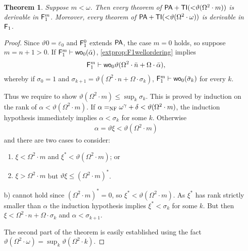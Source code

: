 \documentclass[UKenglish,cleveref,DIV=12]{scrartcl}
\newtheorem{theorem}{Theorem}
\newtheorem{corollary}[lemma]{Corollary}
\theoremstyle{definition}
\theoremstyle{definition}
\begin{document}
\begin{theorem}\label{extcor:F1lowerbound}\label{extthm:F1lowerbound}
Suppose $m<\omega$. Then every theorem of
$\mathsf{PA}+\mathsf{TI}(\mathord<\vartheta(\Omega^2\cdot m))$  is derivable in
$\mathsf{F}_1^{m}$. Moreover, every theorem of
$\mathsf{PA}+\mathsf{TI}(\mathord<\vartheta(\Omega^2\cdot \omega))$ is derivable in
$\mathsf{F}_1$.
\end{theorem}
\begin{proof}
Since $\vartheta0=\varepsilon_0$ and $\mathsf{F}_1^0$ extends $\mathsf{PA}$, the case
$m=0$ holds, so suppose $m=n+1>0$. If $\mathsf{F}_1^m\vdash \mathsf{wo}_0(\bar\alpha)$,
\cref{extprop:F1wellordering} implies
\begin{align*}
 \mathsf{F}_1^{m}\vdash \mathsf{wo}_0 \vartheta(\Omega^2\cdot \bar n+\Omega\cdot\bar\alpha),
\end{align*}
whereby if $\sigma_0=1$ and $\sigma_{k+1}=\vartheta(\Omega^2\cdot n+\Omega\cdot\sigma_k)$, $\mathsf{F}_1^m\vdash \mathsf{wo}_0(\bar\sigma_k)$ for every $k$.

Thus we require to show $\vartheta(\Omega^2\cdot m)\le\sup_k\sigma_k$. This
is proved by induction on the rank of $\alpha<\vartheta(\Omega^2\cdot
m)$. If $\alpha=_{\mathrm{NF}}\omega^\gamma+\delta<\vartheta(\Omega^2\cdot m)$, the induction
hypothesis immediately implies $\alpha<\sigma_k$ for some $k$. Otherwise
\begin{align*}
 \alpha=\vartheta\xi<\vartheta(\Omega^2\cdot m)
\end{align*}
and there are two cases to consider:
\begin{enumerate}%
 \item $\xi<\Omega^2\cdot m$ and $\xi^*<\vartheta(\Omega^2\cdot m)$; or
 \item $\xi>\Omega^2\cdot m$ but $\vartheta\xi\le(\Omega^2\cdot m)^*$.
\end{enumerate}
b) cannot hold since $(\Omega^2\cdot m)^*=0$, so $\xi^*<\vartheta(\Omega^2\cdot m)$. As $\xi^*$ has rank strictly
smaller than $\alpha$ the induction hypothesis
implies $\xi^*<\sigma_k$ for some $k$. But then $\xi<\Omega^2\cdot n+\Omega\cdot\sigma_k$ and
$\alpha<\sigma_{k+1}$.

The second part of the theorem is easily established using the fact $\vartheta(\Omega^2\cdot\omega)=\sup_k\vartheta(\Omega^2\cdot k)$.
\end{proof}
\end{document}
